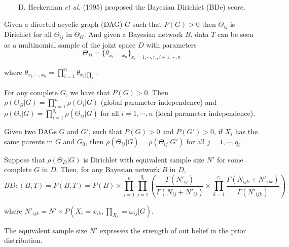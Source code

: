 ~~~~D. Heckerman \emph{et al.} (1995) proposed the Bayesian Dirichlet (BDe) score.

Given a directed acyclic graph (DAG) $G$ such that $P(G)>0$ then $\varTheta_{ij}$ is Dirichlet for all $\varTheta_{ij}$ in $\varTheta_{G}$. And given a Bayesian network $B$, data $T$ can be seen as a multinomial sample of the joint space $D$ with parameters
$$\Theta_{D}=\{\theta_{x_{1},\cdots,x_{n}}\}_{x_{i}=1,\cdots,r_{i},i\in1,\cdots,n}$$

where $\theta_{x_{1}, \cdots, x_{n}} = \prod_{i=1}^{n}\theta_{x_{I}|\prod_{x_{i}}}$.

For any complete $G$, we have that $P(G) > 0$. Then $\rho(\varTheta_{G}|G)=\prod_{i=1}^{n}\rho(\varTheta_{i}|G)$ (global parameter independence) and $\rho(\varTheta_{i}|G)=\prod_{i=1}^{q_{i}}\rho(\varTheta_{ij}|G)$ for all $i=1,\cdots,n$ (local parameter independence).

Given two DAGs $G$ and $G'$, such that $P(G)>0$ and $P(G')>0$, if $X_{i}$ has the same parents in $G$ and $G_{0}$, then $\rho(\varTheta_{ij}|G)=\rho(\varTheta_{ij}|G')$ for all $j=1,\cdots,q_{i}$.

Suppose that $\rho(\Theta_{D}|G)$ is Dirichlet with equivalent sample size $N'$ for some complete $G$ in $D$. Then, for any Bayesian network $B$ in $D$,
$$BDe(B,T) = P(B,T)=P(B)\times\prod_{i=1}^{n}\prod_{j=1}^{q_{i}}(\frac{\Gamma(N'_{ij})}{\Gamma(N_{ij}+N'_{ij})}\times\prod_{k=1}^{r_{i}}\frac{\Gamma(N_{ijk}+N'_{ijk})}{\Gamma(N'_{ijk})})$$

where $N'_{ijk} = N' \times P(X_{i} = x_{ik}, \prod_{X_{i}} = \omega_{ij}|G)$.

The equivalent sample size $N'$ expresses the strength of out belief in the prior distribution.
